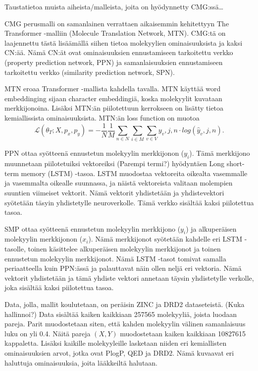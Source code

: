 \documentclass[finnish,twoside,censored,subject,sw-line]{HYthesisML}
\begin{document}
Taustatietoa muista aiheista/malleista, joita on hyödynnetty CMG:ssä\dots

CMG perusmalli on samanlainen verrattaen aikaisemmin kehitettyyn The Transformer -malliin (Molecule Translation Network, MTN).\cite{TheTransformer}
CMG:tä on laajennettu tästä lisäämällä siihen tietoa molekyylien ominaisuuksista ja kaksi CN:ää.
Nämä CN:ät ovat ominaisuuksien ennustamiseen tarkoitettu verkko (property prediction network, PPN) ja samanlaisuuksien ennustamiseen tarkoitettu verkko (similarity prediction network, SPN).

MTN eroaa Transformer -mallista kahdella tavalla.
MTN käyttää word embeddinging sijaan character embeddingiä, koska molekyylit kuvataan merkkijonoina.
Lisäksi MTN:än piilotettuun kerrokseen on lisätty tietoa kemiallissista ominaisuuksista.
MTN:än loss function on muotoa \[\mathcal{L} (\theta_T;X,p_x,p_y) = -\frac{1}{N}\frac{1}{M}\sum_{n \in N}\sum_{i \in M}\sum_{v \in V}y_v,j,n \cdot log(\hat{y}_v,j,n).\]

PPN ottaa syötteenä ennustetun molekyylin merkkijonon ($y_i$).
Tämä merkkijono muunnetaan piilotetuiksi vektoreiksi (Parempi termi?) hyödyntäen Long short-term memory (LSTM) -tasoa.
LSTM muodostaa vektoreita oikealta vasemmalle ja vasemmalta oikealle suunnassa, ja näistä vektoreista valitaan molempien suuntien viimeiset vektorit.
Nämä vektorit yhdistetään ja yhdistevektori syötetään täsyin yhdistetylle neuroverkolle.
Tämä verkko sisältää kaksi piilotettua tasoa.

SMP ottaa syötteenä ennustetun molekyylin merkkijono ($y_i$) ja alkuperäisen molekyylin merkkijonon ($x_i$).
Nämä merkkijonot syötetään kahdelle eri LSTM -tasolle, toinen käsittelee alkuperäisen molekyylin merkkijonot ja toinen ennustetun molekyylin merkkijonot.
Nämä LSTM -tasot tomivat samalla periaatteella kuin PPN:ässä ja palauttavat näin ollen neljä eri vektoria.
Nämä vektorit yhdistetään ja tämä yhdiste vektori annetaan täysin yhdistetylle verkolle, joka sisältää kaksi piilotettua tasoa.

Data, jolla, mallit koulutetaan, on peräisin ZINC ja DRD2 dataseteistä. (Kuka hallinnoi?)
Data sisältää kaiken kaikkiaan 257565 molekyyliä, joista luodaan pareja.
Parit muodostetaan siten, että kahden molekyylin välinen samanlaisuus luku on yli 0.4.
Näitä pareja $(X,Y)$ muodostetaan kaiken kaikkiaan 10827615 kappaletta.
Lisäksi kaikille molekyyleille lasketaan niiden eri kemiallisten ominaisuuksien arvot, jotka ovat PlogP, QED ja DRD2.
Nämä kuvaavat eri haluttuja ominaisuuksia, joita lääkkeiltä halutaan.
\end{document}
